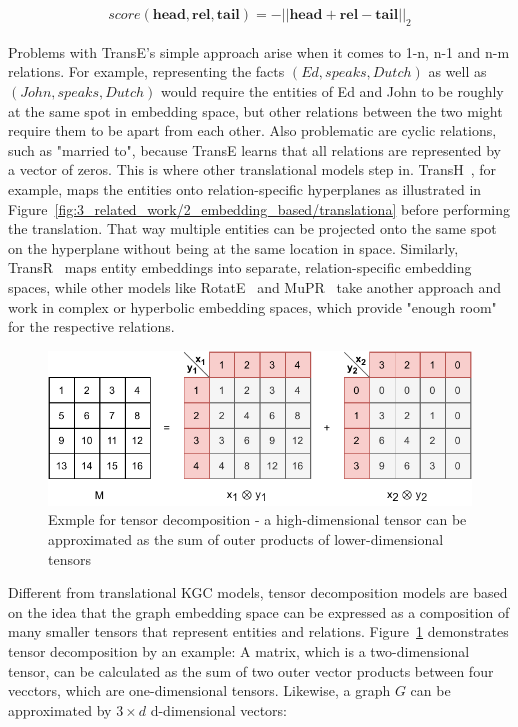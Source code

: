 \begin{align}
    score(\textbf{head}, \textbf{rel}, \textbf{tail}) = {- || \textbf{head} + \textbf{rel} - \textbf{tail} ||}_{2}
    \label{eq:3_related_work/2_embedding_based/trans_e}
\end{align}

Problems with TransE's simple approach arise when it comes to 1-n, n-1 and n-m relations. For example, representing the facts $(Ed, speaks, Dutch)$ as well as $(John, speaks, Dutch)$ would require the entities of Ed and John to be roughly at the same spot in embedding space, but other relations between the two might require them to be apart from each other. Also problematic are cyclic relations, such as "married to", because TransE learns that all relations are represented by a vector of zeros. This is where other translational models step in. TransH~\cite{Wang2014KnowledgeGE}, for example, maps the entities onto relation-specific hyperplanes as illustrated in Figure~\ref{fig:3_related_work/2_embedding_based/translationa} before performing the translation. That way multiple entities can be projected onto the same spot on the hyperplane without being at the same location in space. Similarly, TransR~\cite{Lin2015LearningEA} maps entity embeddings into separate, relation-specific embedding spaces, while other models like RotatE~\cite{Sun2019RotatEKG} and MuPR~\cite{Balazevic2019MultirelationalPG} take another approach and work in complex or hyperbolic embedding spaces, which provide "enough room" for the respective relations.

\begin{figure}[t]
    \centering
    \includegraphics{3_related_work/2_embedding_based/tensor_decomposition}
    \caption{Exmple for tensor decomposition - a high-dimensional tensor can be approximated as the sum of outer products of lower-dimensional tensors}
    \label{fig:3_related_work/2_embedding_based/tensor_decomposition}
\end{figure}

Different from translational KGC models, tensor decomposition models are based on the idea that the graph embedding space can be expressed as a composition of many smaller tensors that represent entities and relations. Figure~\ref{fig:3_related_work/2_embedding_based/tensor_decomposition} demonstrates tensor decomposition by an example: A matrix, which is a two-dimensional tensor, can be calculated as the sum of two outer vector products between four vecctors, which are one-dimensional tensors. Likewise, a graph $G$ can be approximated by $3 \times d$ d-dimensional vectors:

